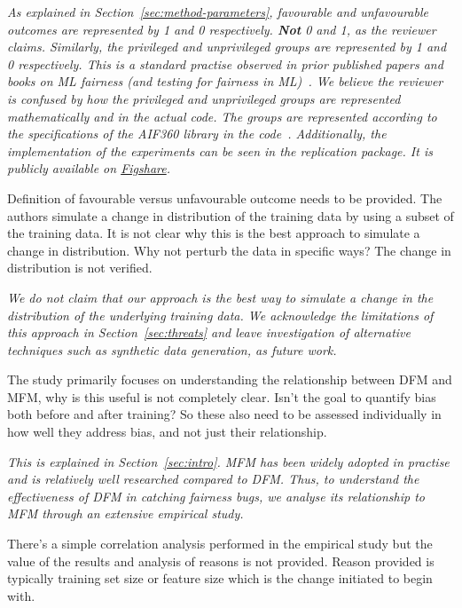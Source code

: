 \documentclass[conference,review,anonymous]{IEEEtran}
\newcommand{\highlight}[1]{\begin{framed}%
  \noindent\emph{#1}
\end{framed}}
\begin{document}
\highlight{As explained in Section~\ref{sec:method-parameters}, favourable and unfavourable outcomes are represented by 1 and 0 respectively. \textbf{Not} 0 and 1, as the reviewer claims. Similarly, the privileged and unprivileged groups are represented by 1 and 0 respectively. This is a standard practise observed in prior published papers and books on ML fairness (and testing for fairness in ML)~\cite{barocas2019fairness,zhang2021ignorance,biswas2021fair}. We believe the reviewer is confused by how the privileged and unprivileged groups are represented mathematically and in the actual code. The groups are represented according to the specifications of the \emph{AIF360} library in the code~\cite{bellamy2019ai}. Additionally, the implementation of the experiments can be seen in the replication package. It is publicly available on \href{https://figshare.com/s/67206f7c219b12885a6f}{Figshare}.}

Definition of favourable versus unfavourable outcome needs to be provided. The authors simulate a change in distribution of the training data by using a subset of the training data. It is not clear why this is the best approach to simulate a change in distribution. Why not perturb the data in specific ways? The change in distribution is not verified.

\highlight{We do not claim that our approach is the best way to simulate a change in the distribution of the underlying training data. We acknowledge the limitations of this approach in Section~\ref{sec:threats} and leave investigation of alternative techniques such as synthetic data generation, as future work.}

The study primarily focuses on understanding the relationship between DFM and MFM, why is this useful is not completely clear. Isn't the goal to quantify bias both before and after training? So these also need to be assessed individually in how well they address bias, and not just their relationship. 

\highlight{This is explained in Section~\ref{sec:intro}. MFM has been widely adopted in practise and is relatively well researched compared to DFM. Thus, to understand the effectiveness of DFM in catching fairness bugs, we analyse its relationship to MFM through an extensive empirical study.}

There's a simple correlation analysis performed in the empirical study but the value of the results and analysis of reasons is not provided. Reason provided is typically training set size or feature size which is the change initiated to begin with.
\end{document}
